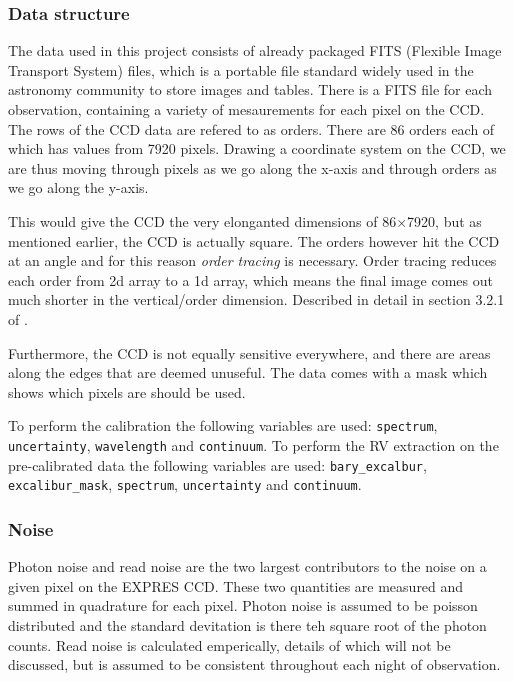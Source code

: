 
\subsubsection{Data structure}
The data used in this project consists of already packaged FITS (Flexible Image Transport System) files, which is a portable file standard widely used in the astronomy community to store images and tables. There is a FITS file for each observation, containing a variety of mesaurements for each pixel on the CCD. 
The rows of the CCD data are refered to as orders. There are 86 orders each of which has values from 7920 pixels. Drawing a coordinate system on the CCD, we are thus moving through pixels as we go along the x-axis and through orders as we go along the y-axis.

This would give the CCD the very elonganted dimensions of 86$\times$7920, but as mentioned earlier, the CCD is actually square. The orders however hit the CCD at an angle and for this reason \emph{order tracing} is necessary. Order tracing reduces each order from 2d array to a 1d array, which means the final image comes out much shorter in the vertical/order dimension. Described in detail in section 3.2.1 of \cite{first_RV_from_EXPRES}.

Furthermore, the CCD is not equally sensitive everywhere, and there are areas along the edges that are deemed unuseful. The data comes with a mask which shows which pixels are should be used. 

To perform the calibration the following variables are used: \verb|spectrum|, \verb|uncertainty|, \verb|wavelength| and \verb|continuum|. To perform the RV extraction on the pre-calibrated data the following variables are used: \verb|bary_excalbur|, 
\verb|excalibur_mask|, \verb|spectrum|, \verb|uncertainty| and \verb|continuum|.

\subsubsection{Noise}
Photon noise and read noise are the two largest contributors to the noise on a given pixel on the EXPRES CCD. These two quantities are measured and summed in quadrature for each pixel. Photon noise is assumed to be poisson distributed and the standard devitation is there teh square root of the photon counts. Read noise is calculated emperically, details of which will not be discussed, but is assumed to be consistent throughout each night of observation. 

